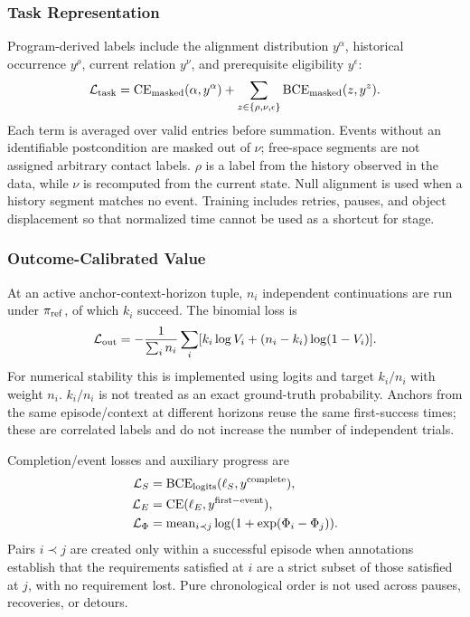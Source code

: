 \documentclass[
  10pt,
]{article}
\begin{document}
\hypertarget{task-representation}{%
\subsubsection{Task Representation}\label{task-representation}}

Program-derived labels include the alignment distribution \(y^\alpha\), historical occurrence \(y^\rho\), current relation \(y^\nu\), and prerequisite eligibility \(y^\epsilon\):
\begin{equation}\label{eq:taskloss}
\mathcal L_{\rm task}=
\operatorname{CE}_{\rm masked}(\alpha,y^\alpha)+
\sum_{z\in\{\rho,\nu,\epsilon\}}\operatorname{BCE}_{\rm masked}(z,y^z).
\end{equation}
Each term is averaged over valid entries before summation. Events without an identifiable postcondition are masked out of \(\nu\); free-space segments are not assigned arbitrary contact labels. \(\rho\) is a label from the history observed in the data, while \(\nu\) is recomputed from the current state. Null alignment is used when a history segment matches no event. Training includes retries, pauses, and object displacement so that normalized time cannot be used as a shortcut for stage.

\hypertarget{outcome-calibrated-value}{%
\subsubsection{Outcome-Calibrated Value}\label{outcome-calibrated-value}}

At an active anchor-context-horizon tuple, \(n_i\) independent continuations are run under \(\pi_{\rm ref}\), of which \(k_i\) succeed. The binomial loss is
\begin{equation}\label{eq:outloss}
\mathcal L_{\rm out}
=-\frac{1}{\sum_i n_i}\sum_i
[k_i\log V_i+(n_i-k_i)\log(1-V_i)].
\end{equation}
For numerical stability this is implemented using logits and target \(k_i/n_i\) with weight \(n_i\). \(k_i/n_i\) is not treated as an exact ground-truth probability. Anchors from the same episode/context at different horizons reuse the same first-success times; these are correlated labels and do not increase the number of independent trials.

Completion/event losses and auxiliary progress are
\begin{equation}\label{eq:evallossbasic}
\begin{aligned}
\mathcal L_S&=\operatorname{BCE}_{\rm logits}(\ell_S,y^{\rm complete}),\\
\mathcal L_E&=\operatorname{CE}(\ell_E,y^{\rm first-event}),\\
\mathcal L_\Phi&=\operatorname{mean}_{i\prec j}\log(1+\exp(\Phi_i-\Phi_j)).
\end{aligned}
\end{equation}
Pairs \(i\prec j\) are created only within a successful episode when annotations establish that the requirements satisfied at \(i\) are a strict subset of those satisfied at \(j\), with no requirement lost. Pure chronological order is not used across pauses, recoveries, or detours.
\end{document}
